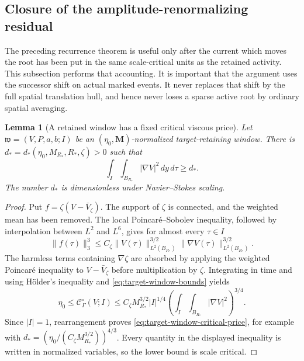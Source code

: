\documentclass[11pt]{amsart}
\numberwithin{equation}{section}
\theoremstyle{plain}
\newtheorem{lemma}[lemma]{Lemma}
\theoremstyle{definition}
\theoremstyle{remark}
\newcommand{\OscMass}{\mathcal C^{\circ}}
\begin{document}
\subsection{Closure of the amplitude-renormalizing residual}
\label{app:collapsed-residual-closure}

The preceding recurrence theorem is useful only after the current which moves
the root has been put in the same scale-critical units as the retained
activity.  This subsection performs that accounting.  It is important that
the argument uses the successor shift on actual marked events.  It never
replaces that shift by the full spatial translation hull, and hence never
loses a sparse active root by ordinary spatial averaging.

\begin{lemma}[A retained window has a fixed critical viscous price]
\label{lem:target-window-critical-price}
Let \(\mathfrak w=(V,P,a,b;I)\) be an
\((\eta_0,\mathbf M)\)-normalized target-retaining window.  There is
\(d_*=d_*(\eta_0,M_{R_*},R_*,\zeta)>0\) such that
\begin{equation}\label{eq:target-window-critical-price}
 \int_I\int_{B_{R_*}}|\nabla V|^2\,dy\,d\tau\ge d_*.
\end{equation}
The number \(d_*\) is dimensionless under Navier--Stokes scaling.
\end{lemma}

\begin{proof}
Put \(f=\zeta(V-\bar V_\zeta)\).  The support of \(\zeta\) is connected,
and the weighted mean has been removed.  The local Poincar\'e--Sobolev
inequality, followed by interpolation between \(L^2\) and \(L^6\), gives for
almost every \(\tau\in I\)
\[
 \|f(\tau)\|_3^3
 \le C_\zeta\|V(\tau)\|_{L^2(B_{R_*})}^{3/2}
       \|\nabla V(\tau)\|_{L^2(B_{R_*})}^{3/2}.
\]
The harmless terms containing \(\nabla\zeta\) are absorbed by applying the
weighted Poincar\'e inequality to \(V-\bar V_\zeta\) before multiplication by
\(\zeta\).  Integrating in time and using H\"older's inequality and
\eqref{eq:target-window-bounds} yields
\[
 \eta_0
 \le \OscMass_\Gamma(V;I)
 \le C_\zeta M_{R_*}^{3/2}|I|^{1/4}
       \left(\int_I\int_{B_{R_*}}|\nabla V|^2\right)^{3/4}.
\]
Since \(|I|=1\), rearrangement proves \eqref{eq:target-window-critical-price},
for example with
\(d_*=(\eta_0/(C_\zeta M_{R_*}^{3/2}))^{4/3}\).
Every quantity in the displayed inequality is written in normalized
variables, so the lower bound is scale critical.
\end{proof}
\end{document}

